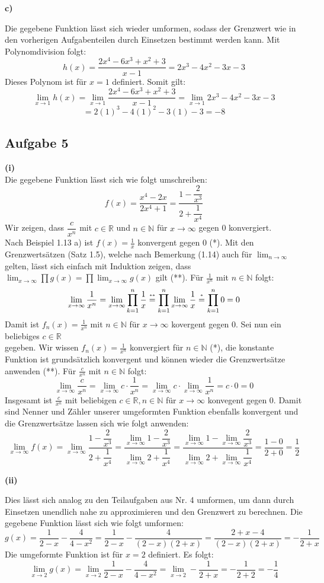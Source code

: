 \documentclass[a4paper,graphics,11pt]{article}
\newcommand{\aufgabe}[1]{\subsection*{Aufgabe #1}}
\newcommand{\up}[2]{\mathrel{\overset{\makebox[0pt]{\mbox{\normalfont\tiny #2}}}{#1}}}
\begin{document}
\textbf{c)}

Die gegebene Funktion lässt sich wieder umformen, sodass der Grenzwert wie in den vorherigen
Aufgabenteilen durch Einsetzen bestimmt werden kann. Mit Polynomdivision folgt:
$$
    h(x) = \frac{2x^4-6x^3+x^2+3}{x-1} = 2x^3-4x^2-3x-3
$$
Dieses Polynom ist für $x=1$ definiert. Somit gilt:
$$
    \lim_{x \to 1} h(x)
    = \lim_{x \to 1} \frac{2x^4-6x^3+x^2+3}{x-1}
    = \lim_{x \to 1} 2x^3-4x^2-3x-3
$$$$
    = 2(1)^3-4(1)^2-3(1)-3 = -8
$$
\aufgabe{5}
\textbf{(i)}\\
Die gegebene Funktion lässt sich wie folgt umschreiben:
$$
    f(x) = \frac{x^4-2x}{2x^4+1} = \frac{1-\dfrac{2}{x^3}}{2+\dfrac{1}{x^4}}
$$
Wir zeigen, dass $\dfrac{c}{x^n}$ mit $c \in \mathbb{R}$ und $n\in \mathbb{N}$ für $x\to \infty$ gegen 0 konvergiert.\\
Nach Beispiel 1.13 a) ist $f(x) = \frac{1}{x}$ konvergent gegen 0 (*). Mit den Grenzwertsätzen
(Satz 1.5), welche nach Bemerkung (1.14) auch für $\lim_{n \to \infty}\limits$ gelten,
lässt sich einfach mit Induktion zeigen, dass
$\lim_{x \to \infty}\limits \prod g(x) = \prod \lim_{x \to \infty}\limits g(x)$ gilt (**).
Für $\frac{1}{x^n}$ mit $n \in \mathbb{N}$ folgt:
$$
    \lim_{x \to \infty} \frac{1}{x^n}
    = \lim_{x \to \infty} \prod_{k=1}^{n} \frac{1}{x}
    \up{=}{**} \prod_{k=1}^{n} \lim_{x \to \infty} \frac{1}{x}
    \up{=}{*} \prod_{k=1}^{n} 0 = 0
$$
Damit ist $f_n(x) = \frac{1}{x^n}$ mit $n \in \mathbb{N}$ für $x\to \infty$ kovergent gegen
0. Sei nun ein beliebiges $c \in \mathbb{R}$\\
gegeben. Wir wissen $f_n(x) = \frac{1}{x^n}$ konvergiert für
$n\in \mathbb{N}$ (*), die konstante Funktion ist grundsätzlich konvergent und können
wieder die Grenzwertsätze anwenden (**).
Für $\frac{c}{x^n}$ mit $n \in \mathbb{N}$ folgt:
$$
    \lim_{x \to \infty} \frac{c}{x^n}
    = \lim_{x \to \infty} c\cdot \frac{1}{x^n}
    = \lim_{x \to \infty} c \cdot \lim_{x \to \infty} \frac{1}{x^n}
    = c \cdot 0 = 0
$$
Insgesamt ist $\frac{c}{x^n}$ mit beliebigen $c \in \mathbb{R}, n \in \mathbb{N}$
für $x \to \infty$ konvegent gegen 0. Damit sind Nenner und Zähler unserer umgeformten
Funktion ebenfalls konvergent und die Grenzwertsätze lassen sich wie folgt anwenden:
$$
    \lim_{x \to \infty} f(x)
    = \lim_{x \to \infty} \frac{1-\dfrac{2}{x^3}}{2+\dfrac{1}{x^4}}
    = \frac{\lim_{x \to \infty}\limits 1 - \dfrac{2}{x^3}}{\lim_{x \to \infty}\limits 2+\dfrac{1}{x^4}} 
    = \frac{\lim_{x \to \infty}\limits 1 - \lim_{x \to \infty}\limits \dfrac{2}{x^3}}
        {\lim_{x \to \infty}\limits 2 + \lim_{x \to \infty}\limits \dfrac{1}{x^4}}
    = \frac{1-0}{2+0} = \frac{1}{2}
$$

\textbf{(ii)}

Dies lässt sich analog zu den Teilaufgaben aus Nr. 4 umformen, um dann durch Einsetzen
unendlich nahe zu approximieren und den Grenzwert zu berechnen. Die gegebene Funktion lässt sich wie folgt umformen:
$$
    g(x) = \frac{1}{2-x} - \frac{4}{4-x^2}
    = \frac{1}{2-x} - \frac{4}{(2-x)(2+x)}
    = \frac{2+x-4}{(2-x)(2+x)}
    = -\frac{1}{2+x}
$$
Die umgeformte Funktion ist für $x=2$ definiert. Es folgt:
$$
    \lim_{x \to 2} g(x)
    = \lim_{x \to 2} \frac{1}{2-x} - \frac{4}{4-x^2}
    = \lim_{x \to 2} - \frac{1}{2+x}
    = - \frac{1}{2+2}
    = -\frac{1}{4}
$$
\end{document}
